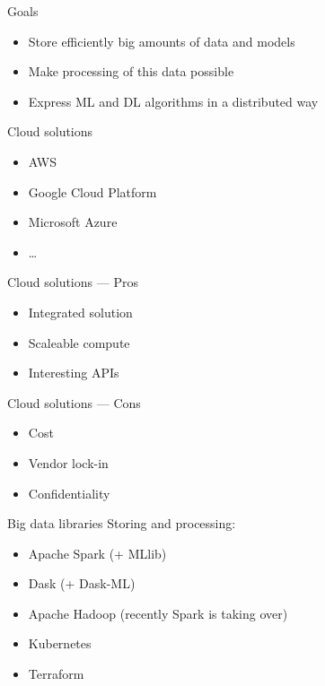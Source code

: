 \begin{frame}{Goals}
  \begin{itemize}[<+->]
    \item Store efficiently big amounts of data and models
    \item Make processing of this data possible
    \item Express ML and DL algorithms in a distributed way
  \end{itemize}
\end{frame}

\begin{frame}{Cloud solutions}
  \begin{itemize}[<+->]
    \item AWS
    \item Google Cloud Platform
    \item Microsoft Azure
    \item …
  \end{itemize}
\end{frame}

\begin{frame}{Cloud solutions --- Pros}
  \begin{itemize}[<+->]
    \item Integrated solution
    \item Scaleable compute
    \item Interesting APIs
  \end{itemize}
\end{frame}

\begin{frame}{Cloud solutions --- Cons}
  \begin{itemize}[<+->]
    \item Cost
    \item Vendor lock-in
    \item Confidentiality
  \end{itemize}
\end{frame}

\begin{frame}{Big data libraries}
  Storing and processing:
  \begin{itemize}[<+->]
    \item Apache Spark (+ MLlib)
    \item Dask (+ Dask-ML)
    \item Apache Hadoop (recently Spark is taking over)
  \end{itemize}  

  \begin{itemize}[<+->]
    \item Kubernetes
    \item Terraform
  \end{itemize}
\end{frame}

